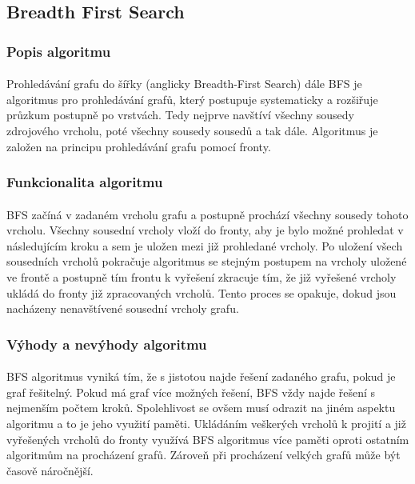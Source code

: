 \documentclass[12pt, titlepage, a4paper]{article}
\begin{document}
\subsection{Breadth First Search}
\subsubsection{Popis algoritmu}
\paragraph{}
Prohledávání grafu do šířky (anglicky Breadth-First Search) dále BFS je algoritmus 
pro prohledávání grafů, který postupuje systematicky a rozšiřuje průzkum postupně po 
vrstvách. Tedy nejprve navštíví všechny sousedy zdrojového vrcholu, poté všechny sousedy 
sousedů a tak dále. Algoritmus je založen na principu prohledávání grafu pomocí fronty.

\subsubsection{Funkcionalita algoritmu}
\paragraph{}
BFS začíná v zadaném vrcholu grafu a postupně prochází všechny sousedy tohoto vrcholu. 
Všechny sousední vrcholy vloží do fronty, aby je bylo možné prohledat v následujícím kroku 
a sem je uložen mezi již prohledané vrcholy. Po uložení všech sousedních vrcholů pokračuje 
algoritmus se stejným postupem na vrcholy uložené ve frontě a postupně tím frontu k vyřešení 
zkracuje tím, že již vyřešené vrcholy ukládá do fronty již zpracovaných vrcholů. Tento proces 
se opakuje, dokud jsou nacházeny nenavštívené sousední vrcholy grafu.

\subsubsection{Výhody a nevýhody algoritmu}
\paragraph{}
BFS algoritmus vyniká tím, že s jistotou najde řešení zadaného grafu, pokud je graf řešitelný.
Pokud má graf více možných řešení, BFS vždy najde řešení s nejmenším počtem kroků. Spolehlivost 
se ovšem musí odrazit na jiném aspektu algoritmu a to je jeho využití paměti. Ukládáním veškerých 
vrcholů k projití a již vyřešených vrcholů do fronty využívá BFS algoritmus více paměti oproti ostatním algoritmům
na procházení grafů. Zároveň při procházení velkých grafů může být časově náročnější.
\end{document}
